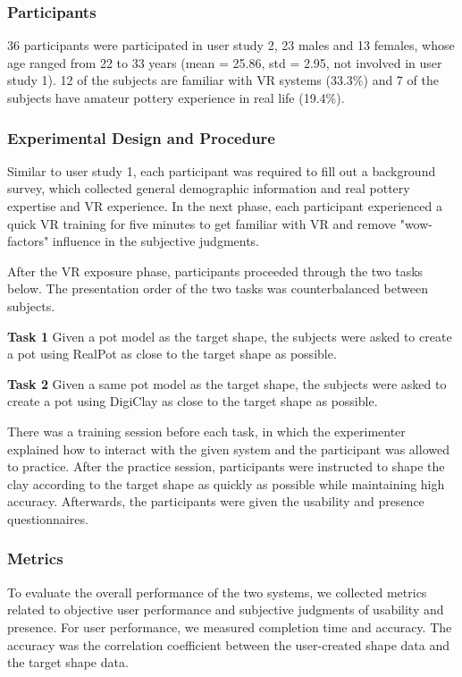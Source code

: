 \documentclass{svjour3}                     %
\begin{document}
\subsubsection{Participants}
36 participants were participated in user study 2, 23 males and 13 females, whose age ranged from 22 to 33 years (mean = 25.86, std = 2.95, not involved in user study 1). 12 of the subjects are familiar with VR systems (33.3\%) and 7 of the subjects have amateur pottery experience in real life (19.4\%).


\subsubsection{Experimental Design and Procedure}

Similar to user study 1, each participant was required to fill out a background survey, which collected general demographic information and real pottery expertise and VR experience.
In the next phase, each participant experienced a quick VR training for five minutes to get familiar with VR and remove "wow-factors" influence in the subjective judgments.

After the VR exposure phase, participants proceeded through the two tasks below. The presentation order of the two tasks was counterbalanced between subjects.

\textbf{Task 1} Given a pot model as the target shape, the subjects were asked to create a pot using RealPot as close to the target shape as possible.

\textbf{Task 2} Given a same pot model as the target shape, the subjects were asked to create a pot using DigiClay as close to the target shape as possible.

There was a training session before each task, in which the experimenter explained how to interact with the given system and the participant was allowed to practice. After the practice session, participants were instructed to shape the clay according to the target shape as quickly as possible while maintaining high accuracy. Afterwards, the participants were given the usability and presence questionnaires.


\subsubsection{Metrics}
To evaluate the overall performance of the two systems, we collected metrics related to objective user performance and subjective judgments of usability and presence.
For user performance, we measured completion time and accuracy.
The accuracy was the correlation coefficient between the user-created shape data and the target shape data.
\end{document}
